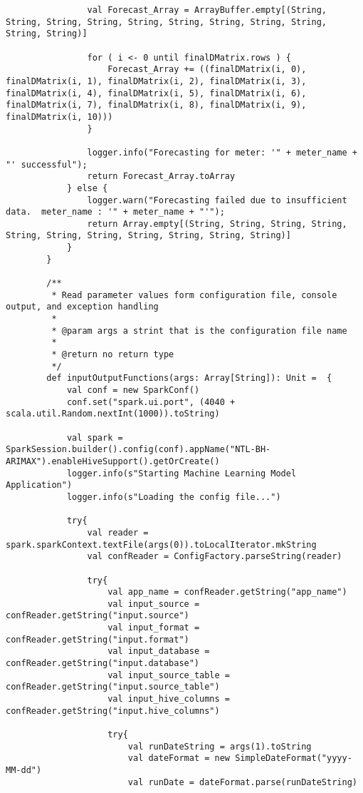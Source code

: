\documentclass[12pt]{article}
\begin{document}
\begin{lstlisting}
       			val Forecast_Array = ArrayBuffer.empty[(String, String, String, String, String, String, String, String, String, String, String)]
    
       			for ( i <- 0 until finalDMatrix.rows ) {
       				Forecast_Array += ((finalDMatrix(i, 0), finalDMatrix(i, 1), finalDMatrix(i, 2), finalDMatrix(i, 3), finalDMatrix(i, 4), finalDMatrix(i, 5), finalDMatrix(i, 6), finalDMatrix(i, 7), finalDMatrix(i, 8), finalDMatrix(i, 9), finalDMatrix(i, 10)))
       			}
    
       			logger.info("Forecasting for meter: '" + meter_name + "' successful");
       			return Forecast_Array.toArray
       		} else {
       			logger.warn("Forecasting failed due to insufficient data.  meter_name : '" + meter_name + "'");
       			return Array.empty[(String, String, String, String, String, String, String, String, String, String, String)]
       		}
       	}
    
       	/**
      	 * Read parameter values form configuration file, console output, and exception handling
      	 * 
      	 * @param args a strint that is the configuration file name
      	 * 
      	 * @return no return type
      	 */
       	def inputOutputFunctions(args: Array[String]): Unit =  {
       		val conf = new SparkConf()
       		conf.set("spark.ui.port", (4040 + scala.util.Random.nextInt(1000)).toString)
    
       		val spark = SparkSession.builder().config(conf).appName("NTL-BH-ARIMAX").enableHiveSupport().getOrCreate()
       		logger.info(s"Starting Machine Learning Model Application")
       		logger.info(s"Loading the config file...")
    
       		try{
       			val reader = spark.sparkContext.textFile(args(0)).toLocalIterator.mkString
       			val confReader = ConfigFactory.parseString(reader)
    
       			try{
       				val app_name = confReader.getString("app_name")
       				val input_source = confReader.getString("input.source")
       				val input_format = confReader.getString("input.format")
       				val input_database = confReader.getString("input.database")
       				val input_source_table = confReader.getString("input.source_table")
       				val input_hive_columns = confReader.getString("input.hive_columns")
    
       				try{
       					val runDateString = args(1).toString
       					val dateFormat = new SimpleDateFormat("yyyy-MM-dd")
       					val runDate = dateFormat.parse(runDateString)
    

\end{lstlisting}
\end{document}
